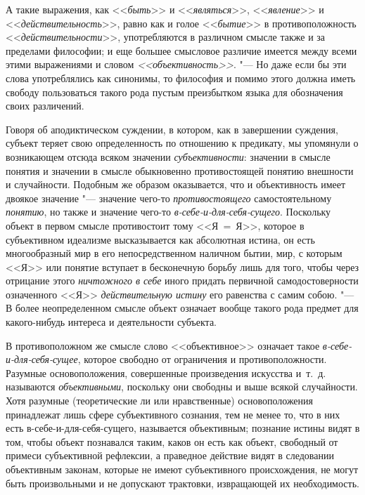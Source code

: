 А такие выражения, как <<{\em быть}>> и <<{\em являться}>>,
<<{\em явление}>> и <<{\em действительность}>>, равно как и голое
<<{\em бытие}>> в противоположность <<{\em действительности}>>,
употребляются в различном смысле также и за пределами
философии; и еще большее смысловое различие имеется между всеми этими
выражениями и словом {\em <<объективность>>}. "---
Но даже если бы эти слова употреблялись как синонимы, то
философия и помимо этого должна иметь свободу пользоваться такого рода
пустым преизбытком языка для обозначения своих различений.

Говоря об аподиктическом суждении, в котором, как в завершении
суждения, субъект теряет свою определенность по отношению к предикату, мы
упомянули о возникающем отсюда всяком значении {\em субъективности}:
значении в смысле понятия и значении в смысле обыкновенно
противостоящей понятию внешности и
случайности.
Подобным же образом оказывается, что и объективность имеет
двоякое значение "--- значение чего-то {\em противостоящего}
самостоятельному {\em понятию}, но также и значение чего-то
{\em в-себе-и-для-себя-сущего}.
Поскольку объект в первом смысле противостоит тому <<Я~=~Я>>,
которое в субъективном идеализме высказывается как абсолютная истина, он
есть многообразный мир в его непосредственном наличном
бытии, мир, с которым <<Я>> или понятие вступает в бесконечную борьбу лишь
для того, чтобы через отрицание этого {\em ничтожного в себе}
иного придать первичной самодостоверности означенного <<Я>>
{\em действительную истину} его равенства с самим
собою.
"--- В более неопределенном смысле объект означает вообще такого
рода предмет для какого-нибудь интереса и деятельности субъекта.

В противоположном же смысле слово <<объективное>> означает такое
{\em в-себе-и-для-себя-сущее},
которое свободно от ограничения и противоположности. Разумные
основоположения, совершенные произведения искусства и~т.~д. называются
{\em объективными},
поскольку они свободны и выше всякой случайности. Хотя
разумные (теоретические ли или нравственные) основоположения принадлежат
лишь сфере субъективного сознания, тем не менее то, что в них есть
в-себе-и-для-себя-сущего, называется объективным; познание истины видят в
том, чтобы объект познавался таким, каков он есть как объект, свободный от
примеси субъективной рефлексии, а праведное действие видят в следовании
объективным законам, которые не имеют субъективного происхождения, не могут
быть произвольными и не допускают трактовки, извращающей их необходимость.

